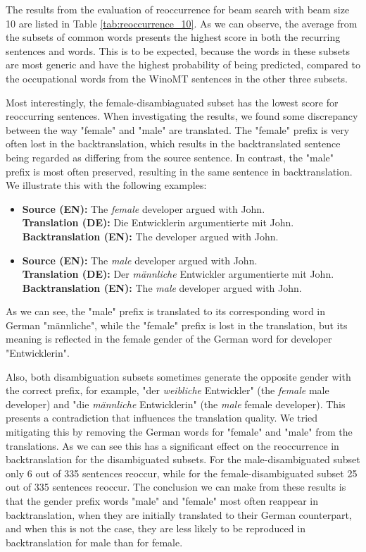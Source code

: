 The results from the evaluation of reoccurrence for beam search with beam size 10 are listed in Table \ref{tab:reoccurrence_10}.
As we can observe, the average from the subsets of common words presents the highest score in both the recurring sentences and words. This is to be expected, because the words in these subsets are most generic and have the highest probability of being predicted, compared to the occupational words from the WinoMT sentences in the other three subsets. 

Most interestingly, the female-disambiaguated subset has the lowest score for reoccurring sentences. When investigating the results, we found some discrepancy between the way "female" and "male" are translated. The "female" prefix is very often lost in the backtranslation, which results in the backtranslated sentence being regarded as differing from the source sentence. In contrast, the "male" prefix is most often preserved, resulting in the same sentence in backtranslation. We illustrate this with the following examples:

\begin{itemize}
    \item \textbf{Source (EN):} The \textit{female} developer argued with John. \\
    \textbf{Translation (DE):} Die Entwicklerin argumentierte mit John. \\
    \textbf{Backtranslation (EN):} The developer argued with John.
    
    \item \textbf{Source (EN):} The \textit{male} developer argued with John. \\
    \textbf{Translation (DE):} Der \textit{männliche} Entwickler argumentierte mit John. \\
    \textbf{Backtranslation (EN):} The \textit{male} developer argued with John.
\end{itemize}

As we can see, the "male" prefix is translated to its corresponding word in German "männliche", while the "female" prefix is lost in the translation, but its meaning is reflected in the female gender of the German word for developer "Entwicklerin".

Also, both disambiguation subsets sometimes generate the opposite gender with the correct prefix, for example, "der \textit{weibliche} Entwickler" (the \textit{female} male developer) and "die \textit{männliche} Entwicklerin" (the \textit{male} female developer). This presents a contradiction that influences the translation quality. We tried mitigating this by removing the German words for "female" and "male" from the translations. As we can see this has a significant effect on the reoccurrence in backtranslation for the disambiguated subsets. For the male-disambiguated subset only 6 out of 335 sentences reoccur, while for the female-disambiguated subset 25 out of 335 sentences reoccur. The conclusion we can make from these results is that the gender prefix words "male" and "female" most often reappear in backtranslation, when they are initially translated to their German counterpart, and when this is not the case, they are less likely to be reproduced in backtranslation for male than for female.

